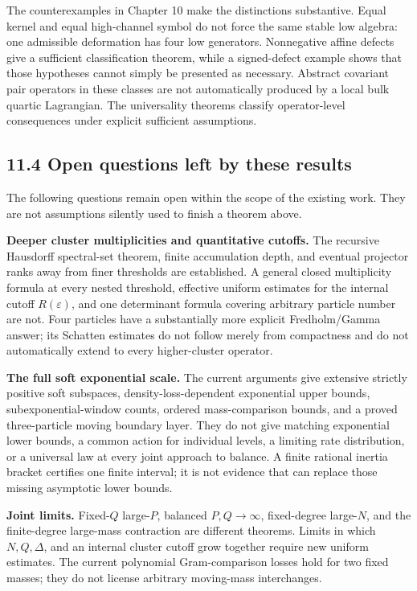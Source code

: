 The counterexamples in Chapter 10 make the distinctions substantive. Equal kernel and equal high-channel symbol do not force the same stable low algebra: one admissible deformation has four low generators. Nonnegative affine defects give a sufficient classification theorem, while a signed-defect example shows that those hypotheses cannot simply be presented as necessary. Abstract covariant pair operators in these classes are not automatically produced by a local bulk quartic Lagrangian. The universality theorems classify operator-level consequences under explicit sufficient assumptions.

\hypertarget{open-questions-left-by-these-results}{%
\subsection{11.4 Open questions left by these results}\label{open-questions-left-by-these-results}}

The following questions remain open within the scope of the existing work. They are not assumptions silently used to finish a theorem above.

\textbf{Deeper cluster multiplicities and quantitative cutoffs.} The recursive Hausdorff spectral-set theorem, finite accumulation depth, and eventual projector ranks away from finer thresholds are established. A general closed multiplicity formula at every nested threshold, effective uniform estimates for the internal cutoff \(R(\varepsilon)\), and one determinant formula covering arbitrary particle number are not. Four particles have a substantially more explicit Fredholm/Gamma answer; its Schatten estimates do not follow merely from compactness and do not automatically extend to every higher-cluster operator.

\textbf{The full soft exponential scale.} The current arguments give extensive strictly positive soft subspaces, density-loss-dependent exponential upper bounds, subexponential-window counts, ordered mass-comparison bounds, and a proved three-particle moving boundary layer. They do not give matching exponential lower bounds, a common action for individual levels, a limiting rate distribution, or a universal law at every joint approach to balance. A finite rational inertia bracket certifies one finite interval; it is not evidence that can replace those missing asymptotic lower bounds.

\textbf{Joint limits.} Fixed-\(Q\) large-\(P\), balanced \(P,Q\to\infty\), fixed-degree large-\(N\), and the finite-degree large-mass contraction are different theorems. Limits in which \(N,Q,\Delta\), and an internal cluster cutoff grow together require new uniform estimates. The current polynomial Gram-comparison losses hold for two fixed masses; they do not license arbitrary moving-mass interchanges.

